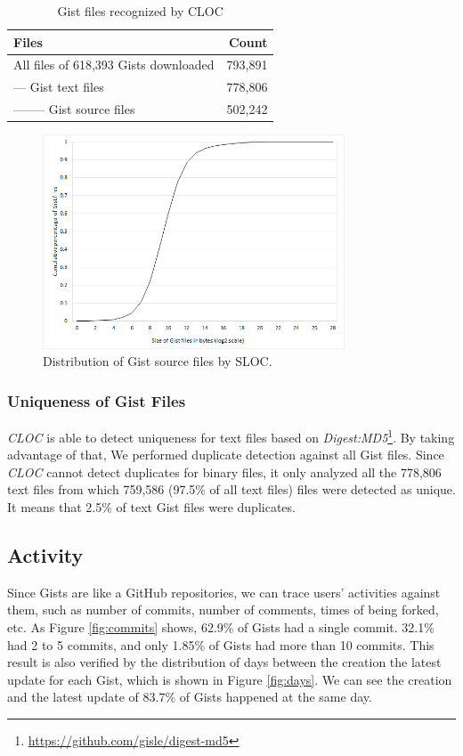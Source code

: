 \begin{table}[!htb]
 \begin{center}
 \begin{tabular}{@{}lr} 
    \textbf{Files}	&	\textbf{Count} \\ \hline
	All files of 618,393 Gists downloaded &	793,891\\
	--- Gist text files	&	778,806\\
	-------- Gist source files &	502,242\\ \hline
 \end{tabular}
 \end{center}
 \caption{Gist files recognized by CLOC}
 \label{tb:clocfiles}
\end{table}

\begin{figure}[!htb]
	\centering
	\includegraphics[width=0.8\textwidth]{figures/gist_file_size_log.png}
	\caption{Distribution of Gist source files by SLOC.}
	\label{fig:sloc}
\end{figure}

\subsubsection{Uniqueness of Gist Files}
\textit{CLOC} is able to detect uniqueness for text files based on \textit{Digest:MD5}\footnote{\url{https://github.com/gisle/digest-md5}}. By taking advantage of that, We performed duplicate detection against all Gist files. Since \textit{CLOC} cannot detect duplicates for binary files, it only analyzed all the 778,806 text files from which 759,586 (97.5\% of all text files) files were detected as unique. It means that 2.5\% of text Gist files were duplicates.

\subsection{Activity}
Since Gists are like a GitHub repositories, we can trace users' activities against them, such as number of commits, number of comments, times of being forked, etc. As Figure \ref{fig:commits} shows, 62.9\% of Gists had a single commit. 32.1\% had 2 to 5 commits, and only 1.85\% of Gists had more than 10 commits. This result is also verified by the distribution of days between the creation the latest update for each Gist, which is shown in Figure \ref{fig:days}. We can see the creation and the latest update of 83.7\% of Gists happened at the same day. 

